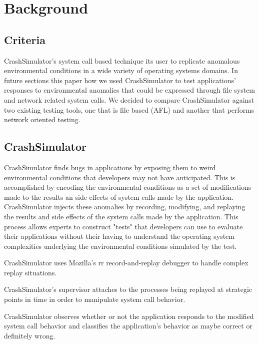 \section{Background}
\label{SEC:background}

\subsection{Criteria}

 CrashSimulator's system call based
technique its user to replicate anomalous environmental conditions in a
wide variety of operating systems domains.  In future sections this paper
how we used CrashSimulator to test applications' responses to environmental
anomalies that could be expressed through file system and network related
system calls.  We decided to compare CrashSimulator against two existing
testing tools, one that is file based (AFL) and another that performs
network oriented testing.

\subsection{CrashSimulator}

CrashSimulator finds bugs in applications by exposing them to weird
environmental conditions that developers may not have anticipated.  This is
accomplished by encoding the environmental conditions as a set of
modifications made to the results an side effects of system calls made by
the application.  CrashSimulator injects these anomalies by recording,
modifying, and replaying the results and side effects of the system calls
made by the application.  This process allows experts to construct "tests"
that developers can use to evaluate their applications without their having
to understand the operating system complexities underlying the
environmental conditions simulated by the test.

CrashSimulator uses Mozilla's rr record-and-replay debugger to handle
complex replay situations.

CrashSimulator's supervisor attaches to the processes being replayed at
strategic points in time in order to manipulate system call behavior.

CrashSimulator observes whether or not the application responds to the
modified system call behavior and classifies the application's behavior as
maybe correct or definitely wrong.

